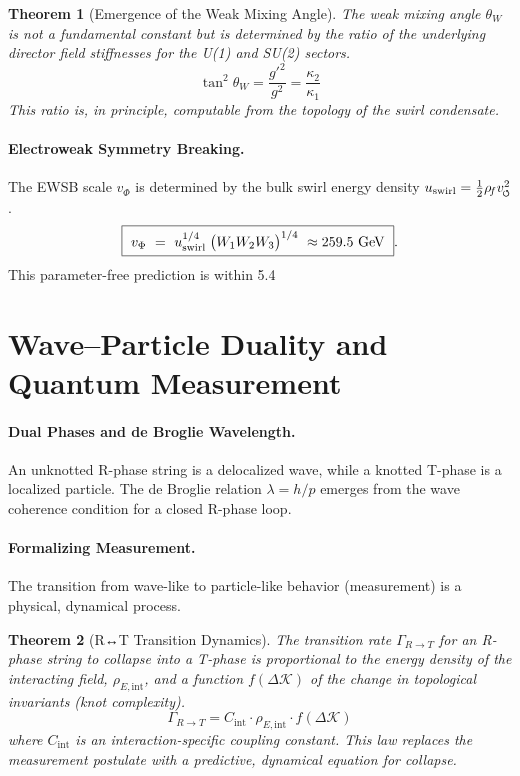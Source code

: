 \documentclass[11pt]{article}
\newcommand{\swirlarrow}{%
    \mathchoice{\mkern-2mu\scriptstyle\boldsymbol{\circlearrowleft}}%
    {\mkern-2mu\scriptstyle\boldsymbol{\circlearrowleft}}%
    {\mkern-2mu\scriptscriptstyle\boldsymbol{\circlearrowleft}}%
    {\mkern-2mu\scriptscriptstyle\boldsymbol{\circlearrowleft}}%
}
\newcommand{\vscore}{v_{\swirlarrow}}                    %
\newcommand{\rhof}{\rho_{\!f}}                           %
\newtheorem{theorem}{Theorem}[section]
\begin{document}
            \begin{theorem}[Emergence of the Weak Mixing Angle]
            The weak mixing angle $\theta_W$ is not a fundamental constant but is determined by the ratio of the underlying director field stiffnesses for the U(1) and SU(2) sectors.
            \[ \boxed{ \tan^2\theta_W = \frac{g'^2}{g^2} = \frac{\kappa_2}{\kappa_1} } \]
            This ratio is, in principle, computable from the topology of the swirl condensate.
            \end{theorem}

        \paragraph{Electroweak Symmetry Breaking.}
            The EWSB scale $v_\Phi$ is determined by the bulk swirl energy density $u_{\rm swirl} = \frac{1}{2}\rhof\vscore^2$.
            \[ \boxed{\ v_\Phi\ =\ u_{\rm swirl}^{1/4}\;\big(W_1 W_2 W_3\big)^{1/4}\ \approx 259.5\ \mathrm{GeV}\ }. \]
            This parameter-free prediction is within 5.4%

\section{Wave–Particle Duality and Quantum Measurement}
\label{sec:wave_particle_duality}
\paragraph{Dual Phases and de Broglie Wavelength.}
    An unknotted R-phase string is a delocalized wave, while a knotted T-phase is a localized particle. The de Broglie relation $\lambda = h/p$ emerges from the wave coherence condition for a closed R-phase loop.

\paragraph{Formalizing Measurement.}
    The transition from wave-like to particle-like behavior (measurement) is a physical, dynamical process.
    \begin{theorem}[R↔T Transition Dynamics]
    The transition rate $\Gamma_{R \to T}$ for an R-phase string to collapse into a T-phase is proportional to the energy density of the interacting field, $\rho_{E, \text{int}}$, and a function $f(\Delta\mathcal{K})$ of the change in topological invariants (knot complexity).
    \[ \boxed{ \Gamma_{R \to T} = C_{\text{int}} \cdot \rho_{E, \text{int}} \cdot f(\Delta\mathcal{K}) } \]
    where $C_{\text{int}}$ is an interaction-specific coupling constant. This law replaces the measurement postulate with a predictive, dynamical equation for collapse.
    \end{theorem}
\end{document}

